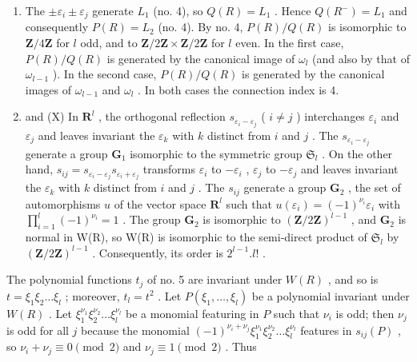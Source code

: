 \begin{enumerate}
\def\labelenumi{(\Roman{enumi})}
\setcounter{enumi}{7}
\item
  The \(\pm \varepsilon_{i} \pm \varepsilon_{j}\) generate \(L_{1}\) (no. 4), so \(Q(R) = L_{1}\) . Hence \(Q(R^{-}) = L_{1}\) and consequently \(P(R) = L_{2}\) (no. 4). By no. 4, \(P(R)/Q(R)\) is isomorphic to \(\mathbf{Z}/4\mathbf{Z}\) for \(l\) odd, and to \(\mathbf{Z}/2\mathbf{Z} \times \mathbf{Z}/2\mathbf{Z}\) for \(l\) even. In the first case, \(P(R)/Q(R)\) is generated by the canonical image of \(\omega_{l}\) (and also by that of \(\omega_{l-1}\) ). In the second case, \(P(R)/Q(R)\) is generated by the canonical images of \(\omega_{l-1}\) and \(\omega_{l}\) . In both cases the connection index is 4.
\item
  and (X) In \(\mathbf{R}^l\) , the orthogonal reflection \(s_{\varepsilon_i - \varepsilon_j}\) ( \(i \neq j\) ) interchanges \(\varepsilon_i\) and \(\varepsilon_j\) and leaves invariant the \(\varepsilon_k\) with \(k\) distinct from \(i\) and \(j\) . The \(s_{\varepsilon_i - \varepsilon_j}\) generate a group \(\mathbf{G}_1\) isomorphic to the symmetric group \(\mathfrak{S}_l\) . On the other hand, \(s_{ij} = s_{\varepsilon_i - \varepsilon_j} s_{\varepsilon_i + \varepsilon_j}\) transforms \(\varepsilon_i\) to \(-\varepsilon_i\) , \(\varepsilon_j\) to \(-\varepsilon_j\) and leaves invariant the \(\varepsilon_k\) with \(k\) distinct from \(i\) and \(j\) . The \(s_{ij}\) generate a group \(\mathbf{G}_2\) , the set of automorphisms \(u\) of the vector space \(\mathbf{R}^l\) such that \(u(\varepsilon_i) = (-1)^{\nu_i} \varepsilon_i\) with \(\prod_{i=1}^{l} (-1)^{\nu_i} = 1\) . The group \(\mathbf{G}_2\) is isomorphic to \((\mathbf{Z}/2\mathbf{Z})^{l-1}\) , and \(\mathbf{G}_2\) is normal in W(R), so W(R) is isomorphic to the semi-direct product of \(\mathfrak{S}_l\) by \((\mathbf{Z}/2\mathbf{Z})^{l-1}\) . Consequently, its order is \(2^{l-1}.l!\) .
\end{enumerate}

The polynomial functions \(t_j\) of no. 5 are invariant under \(W(R)\) , and so is \(t = \xi_1\xi_2\ldots\xi_l\) ; moreover, \(t_l = t^2\) . Let \(P(\xi_1,\ldots ,\xi_l)\) be a polynomial invariant under \(W(R)\) . Let \(\xi_1^{\nu_1}\xi_2^{\nu_2}\ldots\xi_l^{\nu_l}\) be a monomial featuring in \(P\) such that \(\nu_{i}\) is odd; then \(\nu_{j}\) is odd for all \(j\) because the monomial \((-1)^{\nu_i + \nu_j}\xi_1^{\nu_1}\xi_2^{\nu_2}\ldots\xi_l^{\nu_l}\) features in \(s_{ij}(P)\) , so \(\nu_{i} + \nu_{j} \equiv 0 \pmod{2}\) and \(\nu_{j} \equiv 1 \pmod{2}\) . Thus

